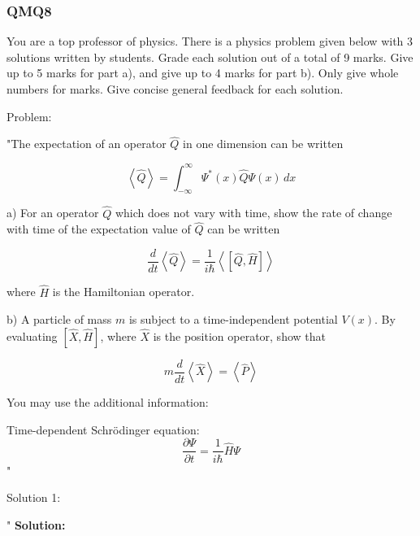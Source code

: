 \subsubsection{QMQ8}

You are a top professor of physics. There is a physics problem given below with 3 solutions written by students. Grade each solution out of a total of 9 marks. Give up to 5 marks for part a), and give up to 4 marks for part b). Only give whole numbers for marks. Give concise general feedback for each solution. 

Problem:

"The expectation of an operator \( \hat{Q} \) in one dimension can be written 

\[ \left< \hat{Q} \right> = \int_{-\infty}^{\infty} \Psi^{*}(x) \hat{Q} \Psi(x) \, dx \]

a) For an operator \( \hat{Q} \) which does not vary with time, show the rate of change with time of the expectation value of \( \hat{Q} \) can be written

\[ \frac{d}{dt}\left<\hat{Q}\right> = \frac{1}{i\hbar}\left< \left[ \hat{Q}, \hat{H} \right] \right> \]

where \( \hat{H} \) is the Hamiltonian operator. 

b) A particle of mass \( m \) is subject to a time-independent potential \( V(x) \). By evaluating \( \left[ \hat{X}, \hat{H}\right] \), where \( \hat{X} \) is the position operator, show that 

\[ m\frac{d}{dt}\left<\hat{X}\right> = \left<\hat{P}\right> \]

You may use the additional information: 

Time-dependent Schrödinger equation: 
\[ \frac{\partial\Psi}{\partial t} = \frac{1}{i\hbar}\hat{H}\Psi \]"

Solution 1: 

"
\textbf{Solution:}

